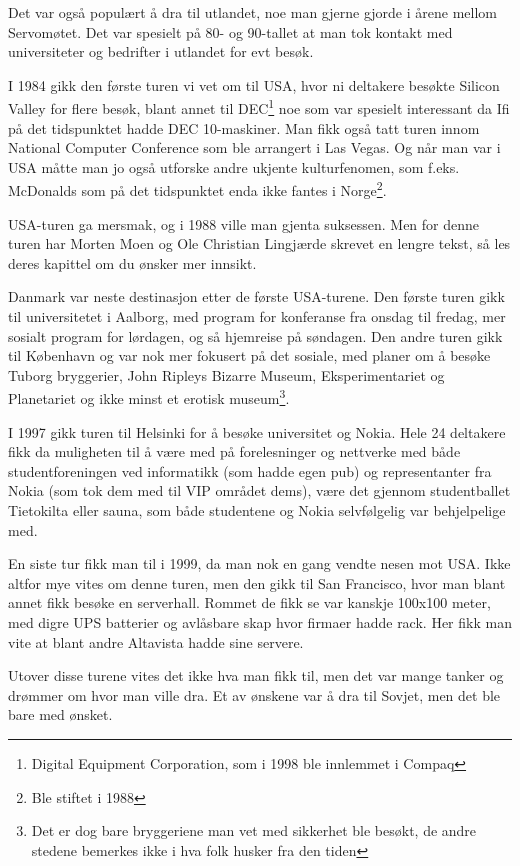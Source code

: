 Det var også populært å dra til utlandet, noe man gjerne gjorde i årene mellom Servomøtet. Det var spesielt på 80- og 90-tallet at man tok kontakt med universiteter og bedrifter i utlandet for evt besøk.

I 1984 gikk den første turen vi vet om til USA, hvor ni deltakere besøkte Silicon Valley for flere besøk, blant annet til DEC\footnote{Digital Equipment Corporation, som i 1998 ble innlemmet i Compaq} noe som var spesielt interessant da Ifi på det tidspunktet hadde DEC 10-maskiner. Man fikk også tatt turen innom National Computer Conference som ble arrangert i Las Vegas. Og når man var i USA måtte man jo også utforske andre ukjente kulturfenomen, som f.eks. McDonalds som på det tidspunktet enda ikke fantes i Norge\footnote{Ble stiftet i 1988}.

USA-turen ga mersmak, og i 1988 ville man gjenta suksessen. Men for denne turen har Morten Moen og Ole Christian Lingjærde skrevet en lengre tekst, så les deres kapittel om du ønsker mer innsikt.

Danmark var neste destinasjon etter de første USA-turene. Den første turen gikk til universitetet i Aalborg, med program for konferanse fra onsdag til fredag, mer sosialt program for lørdagen, og så hjemreise på søndagen. Den andre turen gikk til København og var nok mer fokusert på det sosiale, med planer om å besøke Tuborg bryggerier, John Ripleys Bizarre Museum, Eksperimentariet og Planetariet og ikke minst et erotisk museum\footnote{Det er dog bare bryggeriene man vet med sikkerhet ble besøkt, de andre stedene bemerkes ikke i hva folk husker fra den tiden}.

I 1997 gikk turen til Helsinki for å besøke universitet og Nokia. Hele 24 deltakere fikk da muligheten til å være med på forelesninger og nettverke med både studentforeningen ved informatikk (som hadde egen pub) og representanter fra Nokia (som tok dem med til VIP området dems), være det gjennom studentballet Tietokilta eller sauna, som både studentene og Nokia selvfølgelig var behjelpelige med.

En siste tur fikk man til i 1999, da man nok en gang vendte nesen mot USA. Ikke altfor mye vites om denne turen, men den gikk til San Francisco, hvor man blant annet fikk besøke en serverhall. Rommet de fikk se var kanskje 100x100 meter, med digre UPS batterier og avlåsbare skap hvor firmaer hadde rack. Her fikk man vite at blant andre Altavista hadde sine servere.

Utover disse turene vites det ikke hva man fikk til, men det var mange tanker og drømmer om hvor man ville dra. Et av ønskene var å dra til Sovjet, men det ble bare med ønsket.

